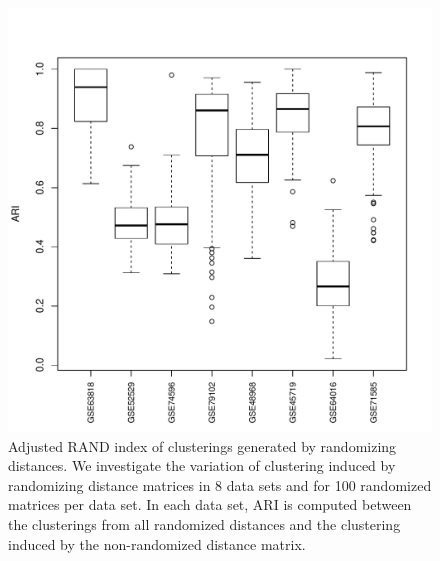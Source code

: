 \documentclass[aoas,preprint]{imsart}
\begin{document}
% 
\begin{figure}[h!]
\includegraphics[scale = 0.7]{Figs/ARI.pdf}
 \caption{
 Adjusted RAND index of 
 clusterings  generated by randomizing distances.
 We investigate the variation of clustering induced by randomizing distance matrices
 in 8 data sets and for 100 randomized matrices per data set.  In each data set, ARI is computed 
 between the clusterings from all randomized distances and the clustering induced by the non-randomized
 distance matrix.
}
  \label{fig:ARI}
\end{figure}
\end{document}
